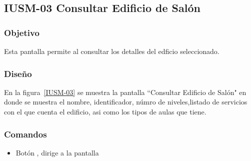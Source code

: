 \subsection{IUSM-03 Consultar Edificio de Salón}

\subsubsection{Objetivo}

	
    Esta pantalla permite al  consultar los detalles del edficio seleccionado.
\subsubsection{Diseño}


    En la figura~\ref{IUSM-03} se muestra la pantalla ``Consultar Edificio de Salón" en donde se muestra el nombre, identificador, númro de niveles,listado de servicios con el que cuenta el edificio, asi como los tipos de aulas que tiene.



\subsubsection{Comandos}
    \begin{itemize}

	\item Botón , dirige a la pantalla  
    \end{itemize}
